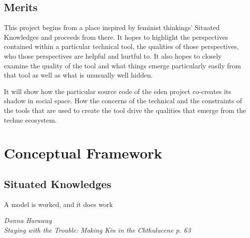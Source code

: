 \documentclass[a4paper,man,natbib]{apa6}
\begin{document}
   \subsection*{Merits}
   This project begins from a place inspired by feminist thinkings' Situated Knowledges and proceeds from there. It hopes to highlight the perspectives contained within a particular technical tool, the qualities of those perspectives, who those perspectives are helpful and hurtful to. It also hopes to closely examine the quality of the tool and what things emerge particularly easily from that tool as well as what is unusually well hidden.

   It will show how the particular source code of the \acrshort{eden} project co-creates its shadow in social space. How the concerns of the technical and the constraints of the tools that are used to create the tool drive the qualities that emerge from the techne ecosystem. 
   \pagebreak
   \section*{Conceptual Framework}
   \subsection*{Situated Knowledges}

   \epigraph{A model is worked, and it does work}{\textit{Donna Haraway \\ Staying with the Trouble: Making Kin in the Chthulucene p. 63}}
\end{document}

